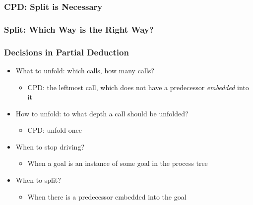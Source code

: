 \documentclass[xcolor=table]{beamer}
\begin{document}
\begin{frame}[fragile]
  \frametitle{CPD: Split is Necessary}
\begin{center}
  
\end{center}
\end{frame}

\begin{frame}[fragile]
  \frametitle{Split: Which Way is the Right Way?}

\end{frame}

\begin{frame}[fragile]
  \frametitle{Decisions in Partial Deduction}
\begin{itemize}
  \item What to unfold: which calls, how many calls?
  \begin{itemize}
    \item CPD: the leftmost call, which does not have a predecessor \emph{embedded} into it
  \end{itemize}
  \item How to unfold: to what depth a call should be unfolded?
  \begin{itemize}
    \item CPD: unfold once
  \end{itemize}
  \item When to stop driving?
  \begin{itemize}
    \item When a goal is an instance of some goal in the process tree
  \end{itemize}
  \item When to split?
  \begin{itemize}
    \item When there is a predecessor embedded into the goal
  \end{itemize}
\end{itemize}
\end{frame}
\end{document}
